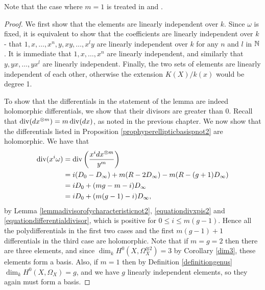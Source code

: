     \begin{rem}
    Note that the case where $m=1$ is treated in \cite[Prop. 7.4.26]{liu} and \cite[Ch. IV, \S 4, Prop. 4.3]{griffiths}.
    \end{rem}

    \begin{proof}
    We first show that the elements are linearly independent over $k$.
    Since $\omega$ is fixed, it is equivalent to show that the coefficients are linearly independent over $k$ - \ie that $1,x,\ldots ,x^n, y, xy, \ldots, x^ly$ are linearly independent over $k$ for any $n$ and $l$ in ${\mathbb N}$.
    It is immediate that $1, x, \ldots, x^n$ are linearly independent, and similarly that $y, yx, \ldots, yx^l$ are linearly independent.
    Finally, the two sets of elements are linearly independent of each other, otherwise the extension $K(X)/k(x)$ would be degree 1.

    To show that the differentials in the statement of the lemma are indeed holomorphic differentials, we show that their divisors are greater than $0$.
    Recall that $\operatorname{div} (dx^{\otimes m}) =m\operatorname{div} (dx)$, as noted in the previous chapter.
    We now show that the differentials listed in Proposition \ref{prophyperellipticbasispnot2} are holomorphic.
    We have that
        \begin{equation}\label{eqbasedifferentialdivisor}
        \begin{split}
        \operatorname{div}(x^i\omega) & =  \operatorname{div} \left( \frac{x^idx^{\otimes m}}{y^m} \right)\\ 
        & =  i(D_0 -D_\infty) + m(R-2D_\infty) -m(R-(g+1)D_\infty) \\
        & =  iD_0 + (mg -m -i)D_\infty \\
        & =  iD_0 + (m(g-1) -i)D_\infty,
        \end{split}
        \end{equation}
    by Lemma \ref{lemmadivisorofycharacteristicnot2}, \eqref{equationdivxpis2} and \eqref{equationdifferentialdivisor}, which is positive for $0\leq i \leq m(g-1)$.
    Hence all the polydifferentials in the first two cases and the first $m(g-1)+1$ differentials in the third case are holomorphic.
    Note that if $m=g=2$ then there are three elements, and since $\dim_kH^0(X,\Omega_X^{\otimes 2})=3$ by Corollary \ref{dim3}, these elements form a basis.
    Also, if $m=1$ then by Definition \ref{definitiongenus} $\dim_k H^0(X,\Omega_X)=g$, and we have $g$ linearly independent elements, so they again must form a basis.
    

\end{proof}
